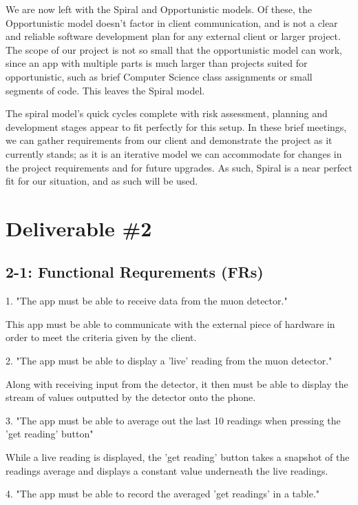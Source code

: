\documentclass[11pt,a4paper]{article}
\begin{document}
We are now left with the Spiral and Opportunistic models. Of these, the Opportunistic model doesn’t factor in client communication, and is not a clear and reliable software development plan for any external client or larger project. The scope of our project is not so small that the opportunistic model can work, since an app with multiple parts is much larger than projects suited for opportunistic, such as brief Computer Science class assignments or small segments of code. This leaves the Spiral model.

The spiral model’s quick cycles complete with risk assessment, planning and development stages appear to fit perfectly for this setup. In these brief meetings, we can gather requirements from our client and demonstrate the project as it currently stands; as it is an iterative model we can accommodate for changes in the project requirements and for future upgrades. As such, Spiral is a near perfect fit for our situation, and as such will be used.

\section*{Deliverable \#2}

\subsection*{2-1: Functional Requrements (FRs)}

\vskip 3mm

1. "The app must be able to receive data from the muon detector."

This app must be able to communicate with the external piece of hardware in order to meet the criteria given by the client. 

\vskip 6mm

2. "The app must be able to display a 'live' reading from the muon detector."

Along with receiving input from the detector, it then must be able to display the stream of values outputted by the detector onto the phone. 

\vskip 6mm

3. "The app must be able to average out the last 10 readings when pressing the 'get reading' button"

While a live reading is displayed, the 'get reading' button takes a snapshot of the readings average and displays a constant value underneath the live readings. 

\vskip 6mm
4. "The app must be able to record the averaged  'get readings' in a table." 
\end{document}
